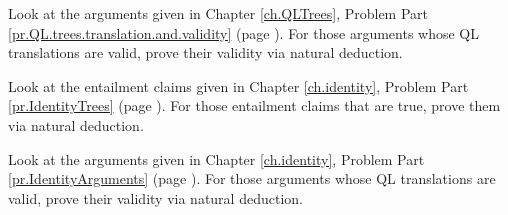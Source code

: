 \problempart
\label{pr.QLND.trees1}
Look at the arguments given in Chapter \ref{ch.QLTrees}, Problem Part \ref{pr.QL.trees.translation.and.validity} (page \pageref{pr.QL.trees.translation.and.validity}). For those arguments whose QL translations are valid, prove their validity via natural deduction.

\problempart
\label{pr.QLND.trees2}
Look at the entailment claims given in Chapter \ref{ch.identity}, Problem Part \ref{pr.IdentityTrees} (page \pageref{pr.IdentityTrees}). For those entailment claims that are true, prove them via natural deduction.

\problempart
\label{pr.QLND.trees3}
Look at the arguments given in Chapter \ref{ch.identity}, Problem Part \ref{pr.IdentityArguments} (page \pageref{pr.IdentityArguments}). For those arguments whose QL translations are valid, prove their validity via natural deduction.

\fi
